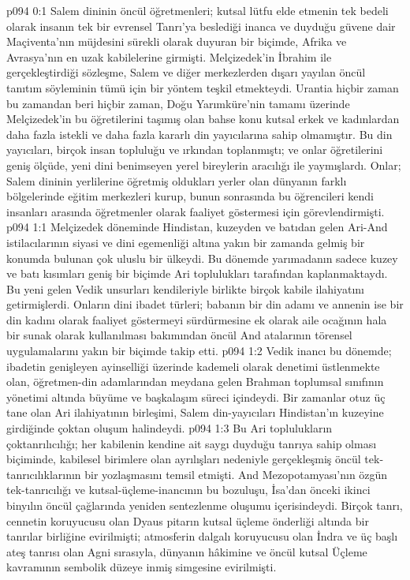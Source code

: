 \vs p094 0:1 Salem dininin öncül öğretmenleri; kutsal lütfu elde etmenin tek bedeli olarak insanın tek bir evrensel Tanrı’ya beslediği inanca ve duyduğu güvene dair Maçiventa’nın müjdesini sürekli olarak duyuran bir biçimde, Afrika ve Avrasya’nın en uzak kabilelerine girmişti. Melçizedek’in İbrahim ile gerçekleştirdiği sözleşme, Salem ve diğer merkezlerden dışarı yayılan öncül tanıtım söyleminin tümü için bir yöntem teşkil etmekteydi. Urantia hiçbir zaman bu zamandan beri hiçbir zaman, Doğu Yarımküre’nin tamamı üzerinde Melçizedek’in bu öğretilerini taşımış olan bahse konu kutsal erkek ve kadınlardan daha fazla istekli ve daha fazla kararlı din yayıcılarına sahip olmamıştır. Bu din yayıcıları, birçok insan topluluğu ve ırkından toplanmıştı; ve onlar öğretilerini geniş ölçüde, yeni dini benimseyen yerel bireylerin aracılığı ile yaymışlardı. Onlar; Salem dininin yerlilerine öğretmiş oldukları yerler olan dünyanın farklı bölgelerinde eğitim merkezleri kurup, bunun sonrasında bu öğrencileri kendi insanları arasında öğretmenler olarak faaliyet göstermesi için görevlendirmişti.
\vs p094 1:1 Melçizedek döneminde Hindistan, kuzeyden ve batıdan gelen Ari\hyp{}And istilacılarının siyasi ve dini egemenliği altına yakın bir zamanda gelmiş bir konumda bulunan çok uluslu bir ülkeydi. Bu dönemde yarımadanın sadece kuzey ve batı kısımları geniş bir biçimde Ari toplulukları tarafından kaplanmaktaydı. Bu yeni gelen Vedik unsurları kendileriyle birlikte birçok kabile ilahiyatını getirmişlerdi. Onların dini ibadet türleri; babanın bir din adamı ve annenin ise bir din kadını olarak faaliyet göstermeyi sürdürmesine ek olarak aile ocağının hala bir sunak olarak kullanılması bakımından öncül And atalarının törensel uygulamalarını yakın bir biçimde takip etti.
\vs p094 1:2 Vedik inancı bu dönemde; ibadetin genişleyen ayinselliği üzerinde kademeli olarak denetimi üstlenmekte olan, öğretmen\hyp{}din adamlarından meydana gelen Brahman toplumsal sınıfının yönetimi altında büyüme ve başkalaşım süreci içindeydi. Bir zamanlar otuz üç tane olan Ari ilahiyatının birleşimi, Salem din\hyp{}yayıcıları Hindistan’ın kuzeyine girdiğinde çoktan oluşum halindeydi.
\vs p094 1:3 Bu Ari toplulukların çoktanrılıcılığı; her kabilenin kendine ait saygı duyduğu tanrıya sahip olması biçiminde, kabilesel birimlere olan ayrılışları nedeniyle gerçekleşmiş öncül tek\hyp{}tanrıcılıklarının bir yozlaşmasını temsil etmişti. And Mezopotamyası’nın özgün tek\hyp{}tanrıcılığı ve kutsal\hyp{}üçleme\hyp{}inancının bu bozuluşu, İsa’dan önceki ikinci binyılın öncül çağlarında yeniden sentezlenme oluşumu içerisindeydi. Birçok tanrı, cennetin koruyucusu olan Dyaus pitarın kutsal üçleme önderliği altında bir tanrılar birliğine evirilmişti; atmosferin dalgalı koruyucusu olan İndra ve üç başlı ateş tanrısı olan Agni sırasıyla, dünyanın hâkimine ve öncül kutsal Üçleme kavramının sembolik düzeye inmiş simgesine evirilmişti.
